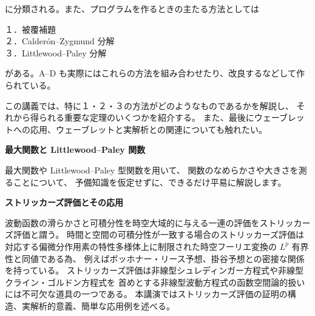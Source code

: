 \documentclass[uplatex,dvipdfmx]{jlreq}
\begin{document}
\noindent
に分類される。また、プログラムを作るときの主たる方法としては

\medskip
\noindent
１．被覆補題\\
２．Calderón--Zygmund 分解\\
３．Littlewood--Paley 分解
\medskip

\noindent
がある。A--D も実際にはこれらの方法を組み合わせたり、改良するなどして作られている。

この講義では、特に１・２・３の方法がどのようなものであるかを解説し、
それから得られる重要な定理のいくつかを紹介する。
また、最後にウェーブレットへの応用、ウェーブレットと実解析との関連についても触れたい。

\newpage

\begin{center}
  {\large\bfseries 最大関数と Littlewood--Paley 関数}
\end{center}

\bigskip
\hspace*{\fill}{\large\bfseries 宮地　晶彦（東京女子大・文理）}

\bigskip

最大関数や Littlewood--Paley 型関数を用いて、
関数のなめらかさや大きさを測ることについて、
予備知識を仮定せずに、できるだけ平易に解説します。

\newpage

\begin{center}
  {\large\bfseries ストリッカーズ評価とその応用}
\end{center}

\bigskip
\hspace*{\fill}{\large\bfseries 小澤　徹（北大・理）}

\bigskip

波動函数の滑らかさと可積分性を時空大域的に与える一連の評価をストリッカーズ評価と謂う。
時間と空間の可積分性が一致する場合のストリッカーズ評価は
対応する偏微分作用素の特性多様体上に制限された時空フーリエ変換の $L^p$ 有界性と同値である為、
例えばボッホナー・リース予想、掛谷予想との密接な関係を持っている。
ストリッカーズ評価は非線型シュレディンガー方程式や非線型クライン・ゴルドン方程式を
首めとする非線型波動方程式の函数空間論的扱いには不可欠な道具の一つである。
本講演ではストリッカーズ評価の証明の構造、実解析的意義、簡単な応用例を述べる。
\end{document}
